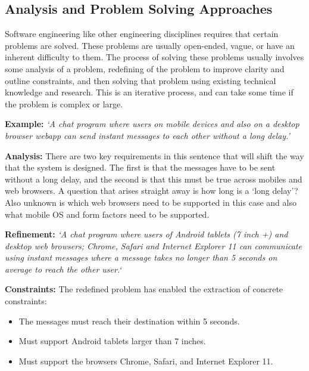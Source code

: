 \documentclass[11pt,english,numbers=endperiod,parskip=half]{scrartcl}
\begin{document}
  \subsection{Analysis and Problem Solving Approaches}

    Software engineering like other engineering disciplines requires that
    certain problems are solved. These problems are usually open-ended, vague,
    or have an inherent difficulty to them. The process of solving these problems
    usually involves some analysis of a problem, redefining of the problem to
    improve clarity and outline constraints, and then solving that problem using
    existing technical knowledge and research. This is an iterative process, and
    can take some time if the problem is complex or large.

    \textbf{Example:}
    \textit{`A chat program where users on mobile devices and also on a desktop
    browser webapp can send instant messages to each other without a long delay.'}

    \textbf{Analysis:}
    There are two key requirements in this sentence that will shift the way that
    the system is designed. The first is that the messages have to be sent without
    a long delay, and the second is that this must be true across mobiles and
    web browsers. A question that arises straight away is how long is a `long
    delay'? Also unknown is which web browsers need to be supported in this case
    and also what mobile OS and form factors need to be supported.

    \textbf{Refinement:}
    \textit{`A chat program where users of Android tablets (7 inch +) and desktop web
    browsers; Chrome, Safari and Internet Explorer 11 can communicate using
    instant messages where a message takes no longer than 5 seconds on average
    to reach the other user.`}

    \textbf{Constraints:}
    The redefined problem has enabled the extraction of concrete constraints:
    \begin{itemize}
      \item{
        The messages must reach their destination within 5 seconds.
      }
      \item{
        Must support Android tablets larger than 7 inches.
      }
      \item{
        Must support the browsers Chrome, Safari, and Internet Explorer 11.
      }
    \end{itemize}
\end{document}
